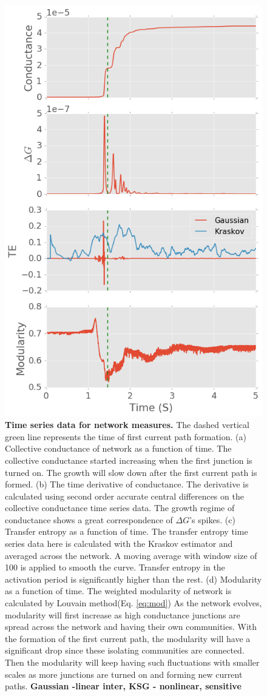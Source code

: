 \documentclass[fleqn,10pt,  amsmath,amssymb,aps]{wlscirep}
\begin{document}
\begin{figure}
	\centering
	\includegraphics[width=0.5\linewidth]{figure/time_series}
	\caption{\textbf{Time series data for network measures.} The dashed vertical green line represents the 			time of first current path formation.
			\newline (a) Collective conductance of network as a function of time. The collective conductance started increasing when the first junction is turned on. The growth will slow down after the first current path is formed.
			\newline (b) The time derivative of conductance. The derivative is calculated using second order accurate central differences on the collective conductance time series data. The growth regime of conductance shows a great correspondence of $\Delta G$'s spikes.
			\newline (c) Transfer entropy as a function of time. The transfer entropy time series data here is calculated with the Kraskov estimator and averaged across the network. A moving average with window size of 100 is applied to smooth the curve. Transfer entropy in the activation period is significantly higher than the rest.
			\newline (d) Modularity as a function of time. The weighted modularity of network is calculated by Louvain method(Eq. \ref{eq:mod}) As the network evolves, modularity will first increase as high conductance junctions are spread across the network and having their own communities. With the formation of the first current path, the modularity will have a significant drop since these isolating communities are connected. Then the modularity will keep having such fluctuations with smaller scales as more junctions are turned on and forming new current paths.
			\textbf{Gaussian -linear inter, KSG - nonlinear, sensitive}}
	\label{fig:time_series}
\end{figure}
\end{document}
